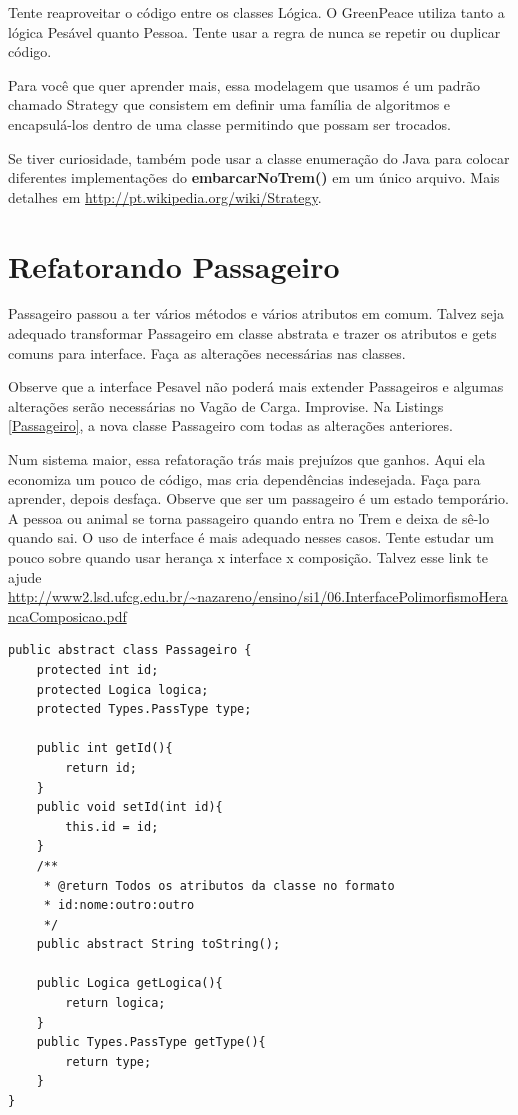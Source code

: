 \documentclass[12pt]{article}
\renewcommand{\bf}[1]{\textbf{#1}}
\begin{document}
{Tente reaproveitar o código entre os classes Lógica. O GreenPeace utiliza tanto a lógica Pesável quanto Pessoa. Tente usar a regra de nunca se repetir ou duplicar código.

Para você que quer aprender mais, essa modelagem que usamos é um padrão chamado
Strategy que consistem em definir uma família de algoritmos e encapsulá-los dentro
de uma classe permitindo que possam ser trocados. 

Se tiver curiosidade, também pode usar a classe enumeração do Java para colocar
diferentes implementações do \bf{embarcarNoTrem()} em um único arquivo. Mais detalhes em \url{http://pt.wikipedia.org/wiki/Strategy}.

\section{Refatorando Passageiro}
Passageiro passou a ter vários métodos e vários atributos em comum.
Talvez seja adequado transformar Passageiro em classe abstrata e trazer
os atributos e gets comuns para interface. Faça as alterações necessárias nas classes.

Observe que a interface Pesavel não poderá mais extender Passageiros e algumas alterações serão necessárias no Vagão de Carga. Improvise. Na Listings \ref{Passageiro}, a nova classe Passageiro com todas as alterações anteriores.

Num sistema maior, essa refatoração trás mais prejuízos que ganhos. Aqui ela economiza um pouco de código, mas cria dependências indesejada. Faça para aprender, depois desfaça. Observe que ser um passageiro é um estado temporário. A pessoa ou animal se torna passageiro quando entra no Trem e deixa de sê-lo quando sai. O uso de interface é mais adequado nesses casos. Tente estudar um pouco sobre quando usar herança x interface x composição. Talvez esse link te ajude
\url{http://www2.lsd.ufcg.edu.br/~nazareno/ensino/si1/06.InterfacePolimorfismoHerancaComposicao.pdf}

\begin{lstlisting}[label=Passageiro, caption=Passageiro, float=ht]
public abstract class Passageiro {
	protected int id;
	protected Logica logica;
	protected Types.PassType type;
	
	public int getId(){
		return id;
	}
	public void setId(int id){
		this.id = id;
	}
	/**
	 * @return Todos os atributos da classe no formato
	 * id:nome:outro:outro
	 */
	public abstract String toString();
	
	public Logica getLogica(){
		return logica;
	}
	public Types.PassType getType(){
		return type;
	}
}
\end{lstlisting}

}
\end{document}
